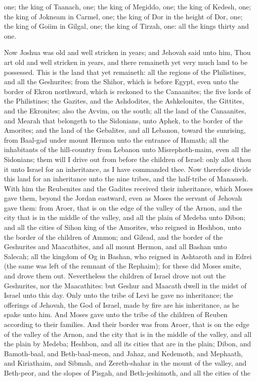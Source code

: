 one; the king of Taanach, one; the king of Megiddo, one; the king of Kedesh, one; the king of Jokneam in Carmel, one; the king of Dor in the height of Dor, one; the king of Goiim in Gilgal, one; the king of Tirzah, one: all the kings thirty and one. 

Now Joshua was old and well stricken in years; and Jehovah said unto him, Thou art old and well stricken in years, and there remaineth yet very much land to be possessed. This is the land that yet remaineth: all the regions of the Philistines, and all the Geshurites; from the Shihor, which is before Egypt, even unto the border of Ekron northward, which is reckoned to the Canaanites; the five lords of the Philistines; the Gazites, and the Ashdodites, the Ashkelonites, the Gittites, and the Ekronites; also the Avvim, on the south; all the land of the Canaanites, and Mearah that belongeth to the Sidonians, unto Aphek, to the border of the Amorites; and the land of the Gebalites, and all Lebanon, toward the sunrising, from Baal-gad under mount Hermon unto the entrance of Hamath; all the inhabitants of the hill-country from Lebanon unto Misrephoth-maim, even all the Sidonians; them will I drive out from before the children of Israel: only allot thou it unto Israel for an inheritance, as I have commanded thee. Now therefore divide this land for an inheritance unto the nine tribes, and the half-tribe of Manasseh.  With him the Reubenites and the Gadites received their inheritance, which Moses gave them, beyond the Jordan eastward, even as Moses the servant of Jehovah gave them: from Aroer, that is on the edge of the valley of the Arnon, and the city that is in the middle of the valley, and all the plain of Medeba unto Dibon; and all the cities of Sihon king of the Amorites, who reigned in Heshbon, unto the border of the children of Ammon; and Gilead, and the border of the Geshurites and Maacathites, and all mount Hermon, and all Bashan unto Salecah; all the kingdom of Og in Bashan, who reigned in Ashtaroth and in Edrei (the same was left of the remnant of the Rephaim); for these did Moses smite, and drove them out. Nevertheless the children of Israel drove not out the Geshurites, nor the Maacathites: but Geshur and Maacath dwell in the midst of Israel unto this day. Only unto the tribe of Levi he gave no inheritance; the offerings of Jehovah, the God of Israel, made by fire are his inheritance, as he spake unto him.  And Moses gave unto the tribe of the children of Reuben according to their families. And their border was from Aroer, that is on the edge of the valley of the Arnon, and the city that is in the middle of the valley, and all the plain by Medeba; Heshbon, and all its cities that are in the plain; Dibon, and Bamoth-baal, and Beth-baal-meon, and Jahaz, and Kedemoth, and Mephaath, and Kiriathaim, and Sibmah, and Zereth-shahar in the mount of the valley, and Beth-peor, and the slopes of Pisgah, and Beth-jeshimoth, and all the cities of the 